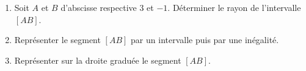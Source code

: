 
 
\begin{enumerate}
\item Soit $A$ et $B$ d'abscisse respective $3$ et $-1$. Déterminer le rayon de l'intervalle $[AB]$.
\item Représenter le segment $[AB]$ par un intervalle puis par une inégalité.

\item Représenter sur la droite graduée le segment $[AB]$.
 
\end{enumerate}
 